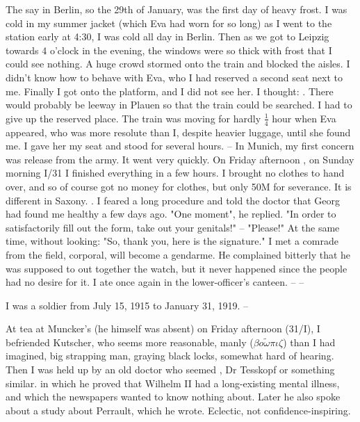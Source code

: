 
The say in Berlin, so the 29th of January, was the first day of heavy frost. I was cold in my summer jacket (which Eva had worn for so long) as I went to the station early at 4:30, I was cold all day in Berlin. Then as we got to Leipzig towards 4 o'clock in the evening, the windows were so thick with frost that I could see nothing. A huge crowd stormed onto the train and blocked the aisles. I didn't know how to behave with Eva, who I had reserved a second seat next to me. Finally I got onto the platform, and I did not see her. I thought: . There would probably be leeway in Plauen so that the train could be searched. I had to give up the reserved place. The train was moving for hardly $\frac{1}{4}$ hour when Eva appeared, who was more resolute than I, despite heavier luggage,  until she found me. I gave her my seat and stood for several hours. -- In Munich, my first concern was release from the army. It went very quickly. On Friday afternoon , on Sunday morning I/31 I finished everything in a few hours. I brought no clothes to hand over, and so of course got no money for clothes, but only 50M for severance. It is different in Saxony. . I feared a long procedure and told the doctor that Georg had found me healthy a few days ago. "One moment", he replied. "In order to satisfactorily fill out the form, take out your genitals!" -- "Please!" At the same time, without looking: "So, thank you, here is the signature." I met a comrade from the field, corporal, will become a gendarme. He complained bitterly that he was supposed to out together the watch, but it never happened since the people had no desire for it. I ate once again in the lower-officer's canteen. -- --

I was a soldier from July 15, 1915 to January 31, 1919. --

At tea at Muncker's (he himself was absent) on Friday afternoon (31/I), I befriended Kutscher, who seems more reasonable, manly ($\beta o\tilde{\omega}\pi\iota\zeta$) than I had imagined, big strapping man, graying black locks, somewhat hard of hearing. Then I was held up by an old doctor who seemed , Dr Tesskopf or something similar.  in which he proved that Wilhelm II had a long-existing mental illness, and which the newspapers wanted to know nothing about. Later he also spoke about a study about Perrault, which he wrote. Eclectic, not confidence-inspiring.

